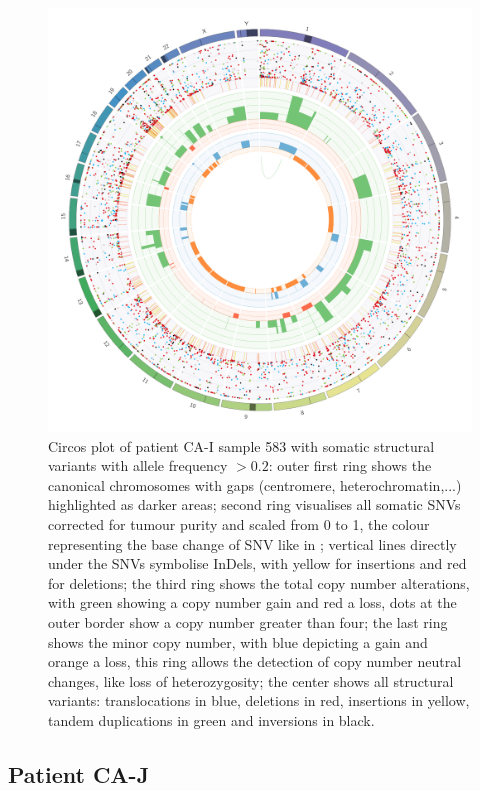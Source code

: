 \begin{figure}[ht]
\centering
\includegraphics[width=.99\linewidth]{Figures/CASCADE/CA51/CA51-583.circos.png}
\caption[Circos plot of patient CA-I sample 583]{Circos plot of patient CA-I sample 583 with somatic structural variants with allele frequency $> 0.2$: outer first ring shows the canonical chromosomes with gaps (centromere, heterochromatin,...) highlighted as darker areas; second ring visualises all somatic SNVs corrected for tumour purity and scaled from 0 to 1, the colour representing the base change of SNV like in \protect\textcite{Alexandrov2013}; vertical lines directly under the SNVs symbolise InDels, with yellow for insertions and red for deletions; the third ring shows the total copy number alterations, with green showing a copy number gain and red a loss, dots at the outer border show a copy number greater than four; the last ring shows the minor copy number, with blue depicting a gain and orange a loss, this ring allows the detection of copy number neutral changes, like loss of heterozygosity; the center shows all structural variants: translocations in blue, deletions in red, insertions in yellow, tandem duplications in green and inversions in black.} \label{fig:ca51.583circos}
\end{figure}


\cleardoublepage
\subsection{Patient CA-J}

